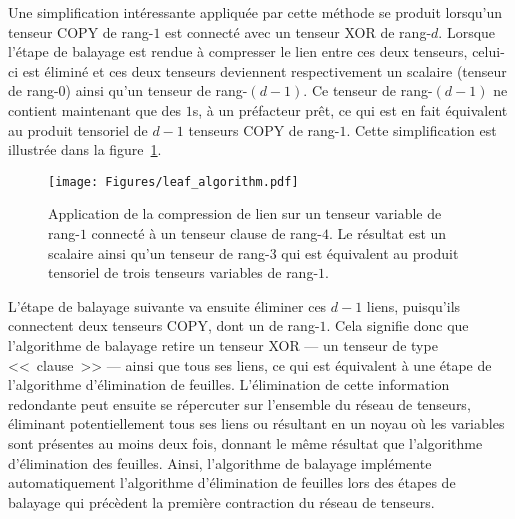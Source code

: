 Une simplification intéressante appliquée par cette méthode se produit lorsqu'un tenseur COPY de rang-$1$ est connecté avec un tenseur XOR de rang-$d$.
Lorsque l'étape de balayage est rendue à compresser le lien entre ces deux tenseurs, celui-ci est éliminé et ces deux tenseurs deviennent respectivement un scalaire (tenseur de rang-$0$) ainsi qu'un tenseur de rang-$(d - 1)$.
Ce tenseur de rang-$(d - 1)$ ne contient maintenant que des $1$s, à un préfacteur prêt, ce qui est en fait équivalent au produit tensoriel de $d - 1$ tenseurs COPY de rang-$1$.
Cette simplification est illustrée dans la figure~\ref{fig:degree1_sweep}.
\begin{figure}[h]
    \centering
    \texttt{[image: Figures/leaf\_algorithm.pdf]}
    \caption[Application de la compression de lien sur un tenseur variable de rang-$1$ connecté à un tenseur clause de rang-$4$.]{Application de la compression de lien sur un tenseur variable de rang-$1$ connecté à un tenseur clause de rang-$4$. Le résultat est un scalaire ainsi qu'un tenseur de rang-$3$ qui est équivalent au produit tensoriel de trois tenseurs variables de rang-$1$.}
    \label{fig:degree1_sweep}
\end{figure}
L'étape de balayage suivante va ensuite éliminer ces $d-1$ liens, puisqu'ils connectent deux tenseurs COPY, dont un de rang-$1$.
Cela signifie donc que l'algorithme de balayage retire un tenseur XOR --- un tenseur de type <<~clause~>> --- ainsi que tous ses liens, ce qui est équivalent à une étape de l'algorithme d'élimination de feuilles.
L'élimination de cette information redondante peut ensuite se répercuter sur l'ensemble du réseau de tenseurs, éliminant potentiellement tous ses liens ou résultant en un noyau où les variables sont présentes au moins deux fois, donnant le même résultat que l'algorithme d'élimination des feuilles.
Ainsi, l'algorithme de balayage implémente automatiquement l'algorithme d'élimination de feuilles lors des étapes de balayage qui précèdent la première contraction du réseau de tenseurs.



